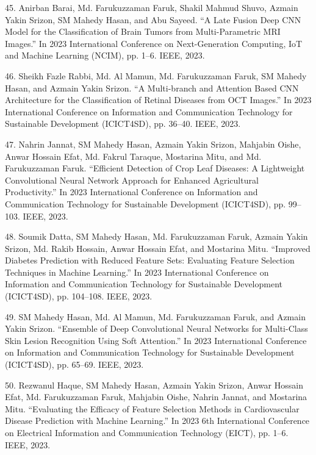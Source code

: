 \documentclass[a4paper,10pt]{article}
\newlength{\cvcolumngapwidth}
\newlength{\cvleftcolumnwidth}
\newlength{\cvrightcolumnwidth}
\newcommand{\cvdurationstyle}[1]{{\small\cvdurationfont\textcolor{cvdurationcolor}{#1}}}
\newlength{\cvafteritemskipamount}
\newlength{\cvparskip}
\newcommand{\cvitem}[2]{
    \begin{minipage}[t]{\cvleftcolumnwidth}
        \raggedleft #1
    \end{minipage}%
    \hspace{\cvcolumngapwidth}%
    \begin{minipage}[t]{\cvrightcolumnwidth}
        \setlength{\parskip}{\cvparskip} #2
    \end{minipage}

    \vspace{\cvafteritemskipamount}
}
\begin{document}
\cvitem{
    \cvdurationstyle{}
}{
45. Anirban Barai, Md. Farukuzzaman Faruk, Shakil Mahmud Shuvo, Azmain Yakin Srizon, SM Mahedy Hasan, and Abu Sayeed. “A Late Fusion Deep CNN Model for the Classification of Brain Tumors from Multi-Parametric MRI Images.” In 2023 International Conference on Next-Generation Computing, IoT and Machine Learning (NCIM), pp. 1–6. IEEE, 2023.
}

\cvitem{
    \cvdurationstyle{}
}{
46. Sheikh Fazle Rabbi, Md. Al Mamun, Md. Farukuzzaman Faruk, SM Mahedy Hasan, and Azmain Yakin Srizon. “A Multi-branch and Attention Based CNN Architecture for the Classification of Retinal Diseases from OCT Images.” In 2023 International Conference on Information and Communication Technology for Sustainable Development (ICICT4SD), pp. 36–40. IEEE, 2023.
}

\cvitem{
    \cvdurationstyle{}
}{
47. Nahrin Jannat, SM Mahedy Hasan, Azmain Yakin Srizon, Mahjabin Oishe, Anwar Hossain Efat, Md. Fakrul Taraque, Mostarina Mitu, and Md. Farukuzzaman Faruk. “Efficient Detection of Crop Leaf Diseases: A Lightweight Convolutional Neural Network Approach for Enhanced Agricultural Productivity.” In 2023 International Conference on Information and Communication Technology for Sustainable Development (ICICT4SD), pp. 99–103. IEEE, 2023.
}

\cvitem{
    \cvdurationstyle{}
}{
48. Soumik Datta, SM Mahedy Hasan, Md. Farukuzzaman Faruk, Azmain Yakin Srizon, Md. Rakib Hossain, Anwar Hossain Efat, and Mostarina Mitu. “Improved Diabetes Prediction with Reduced Feature Sets: Evaluating Feature Selection Techniques in Machine Learning.” In 2023 International Conference on Information and Communication Technology for Sustainable Development (ICICT4SD), pp. 104–108. IEEE, 2023.
}

\cvitem{
    \cvdurationstyle{}
}{
49. SM Mahedy Hasan, Md. Al Mamun, Md. Farukuzzaman Faruk, and Azmain Yakin Srizon. “Ensemble of Deep Convolutional Neural Networks for Multi-Class Skin Lesion Recognition Using Soft Attention.” In 2023 International Conference on Information and Communication Technology for Sustainable Development (ICICT4SD), pp. 65–69. IEEE, 2023.
}

\cvitem{
    \cvdurationstyle{}
}{
50. Rezwanul Haque, SM Mahedy Hasan, Azmain Yakin Srizon, Anwar Hossain Efat, Md. Farukuzzaman Faruk, Mahjabin Oishe, Nahrin Jannat, and Mostarina Mitu. “Evaluating the Efficacy of Feature Selection Methods in Cardiovascular Disease Prediction with Machine Learning.” In 2023 6th International Conference on Electrical Information and Communication Technology (EICT), pp. 1–6. IEEE, 2023.
}
\end{document}
